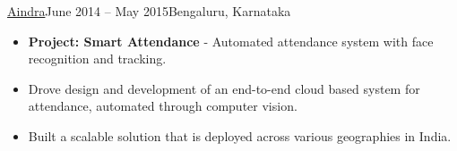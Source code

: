 \documentclass[10pt,a4paper,ragged2e,withhyper]{altacv}
\begin{document}
\begin{paracol}{2}
{\href{https://www.aindra.in/}{Aindra}}{June 2014 – May 2015}{Bengaluru, Karnataka}
\begin{itemize}
\item \textbf{Project: Smart Attendance} - Automated attendance system with face recognition and tracking.
\item Drove design and development of an end-to-end cloud based system for attendance, automated through computer vision.
\item Built a scalable solution that is deployed across various geographies in India.

\end{itemize}





\end{paracol}
\end{document}
